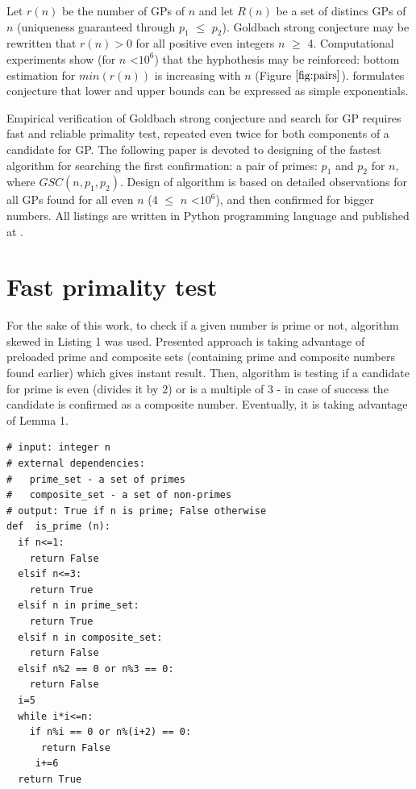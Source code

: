 \documentclass[10pt,twocolumn]{article}
\begin{document}
Let $r(n)$ be the number of GPs of $n$ and let $R(n)$ be a set of distincs GPs of $n$ (uniqueness guaranteed through $p_1$  $\leq$ $p_2$). Goldbach strong conjecture may be rewritten that $r(n) > 0$ for all positive even integers $n$ $\geq$ 4. Computational experiments show (for $n$ \textless $10^6$) that the hyphothesis may be reinforced: bottom estimation for $min(r(n))$ is increasing with $n$ (Figure $\ref{fig:pairs}$). \cite{woon2000} formulates conjecture that lower and upper bounds can be expressed as simple exponentials.\par

Empirical verification of Goldbach strong conjecture and search for GP requires fast and reliable primality test, repeated even twice for both components of a candidate for GP. The following paper is devoted to designing of the fastest algorithm for searching the first confirmation: a pair of primes: $p_1$  and $p_2$ for $n$, where $GSC (n, p_1, p_2)$. Design of algorithm is based on detailed observations for all GPs found for all even $n$ (4 $\leq$ $n$ \textless $10^6$), and then confirmed for bigger numbers. All listings are written in Python programming language and published at \cite{github}. \par

\section{Fast primality test}

For the sake of this work, to check if a given number is prime or not, algorithm skewed in Listing 1 was used. Presented approach is taking advantage of preloaded prime and composite sets (containing prime and composite numbers found earlier) which gives instant result. Then, algorithm is testing if a candidate for prime is even (divides it by $2$) or is a multiple of $3$ - in case of success the candidate is confirmed as a composite number. Eventually, it is taking advantage of Lemma 1.

\lstset{language=Python}
\lstset{breaklines=true}
\lstset{frame=shadowbox}
\begin{lstlisting}[linewidth=8.7cm]
# input: integer n
# external dependencies:
#   prime_set - a set of primes
#   composite_set - a set of non-primes
# output: True if n is prime; False otherwise
def  is_prime (n):
  if n<=1:
    return False
  elsif n<=3:
    return True
  elsif n in prime_set:
    return True
  elsif n in composite_set:
    return False
  elsif n%2 == 0 or n%3 == 0:
    return False
  i=5
  while i*i<=n:
    if n%i == 0 or n%(i+2) == 0:
      return False
     i+=6
  return True
\end{lstlisting}
\end{document}
